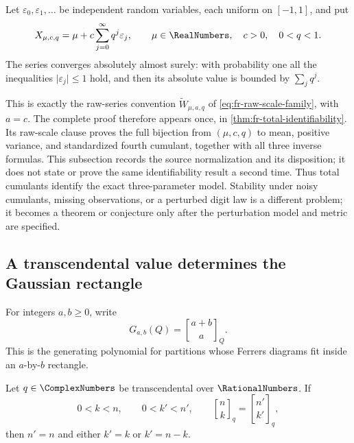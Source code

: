 Let \(\varepsilon_0,\varepsilon_1,\ldots\) be independent random variables,
each uniform on \([-1,1]\), and put
\[
 X_{\mu,c,q}=\mu+c\sum_{j=0}^{\infty}q^j\varepsilon_j,
 \qquad
 \mu\in\RealNumbers,\quad c>0,\quad 0<q<1.
\]
The series converges absolutely almost surely: with probability one all the
inequalities \(\lvert\varepsilon_j\rvert\le1\) hold, and then its absolute value is
bounded by \(\sum_jq^j\).

This is exactly the raw-series convention
\(\widetilde W_{\mu,a,q}\) of
\cref{eq:fr-raw-scale-family}, with \(a=c\).  The complete proof therefore
appears once, in \cref{thm:fr-total-identifiability}.  Its raw-scale clause
proves the full bijection from \((\mu,c,q)\) to mean, positive variance, and
standardized fourth cumulant, together with all three inverse formulas.  This
subsection records the source normalization and its disposition; it does not
state or prove the same identifiability result a second time.
Thus total cumulants identify the exact three-parameter model.  Stability
under noisy cumulants, missing observations, or a perturbed digit law is a
different problem; it becomes a theorem or conjecture only after the
perturbation model and metric are specified.

\subsection{A transcendental value determines the Gaussian rectangle}

For integers \(a,b\ge0\), write
\[
 G_{a,b}(Q)=\genfrac{[}{]}{0pt}{}{a+b}{a}_{Q}.
\]
This is the generating polynomial for partitions whose Ferrers diagrams fit
inside an \(a\)-by-\(b\) rectangle.

\begin{theorem}
\label{thm:transcendental-gaussian-uniqueness}
Let \(q\in\ComplexNumbers\) be transcendental over \(\RationalNumbers\).  If
\[
 0<k<n,\qquad 0<k'<n',\qquad
 \genfrac{[}{]}{0pt}{}{n}{k}_{q}
   =\genfrac{[}{]}{0pt}{}{n'}{k'}_{q},
\]
then \(n'=n\) and either \(k'=k\) or \(k'=n-k\).
\end{theorem}


